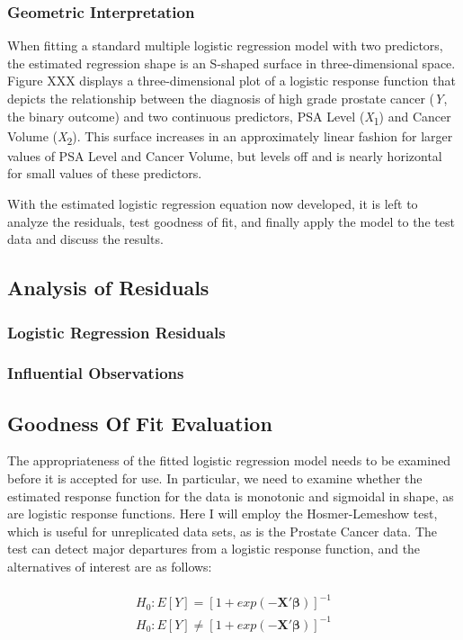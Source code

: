 \subsubsection{Geometric Interpretation}
When fitting a standard multiple logistic regression model with two predictors, the estimated regression shape is an S-shaped surface in three-dimensional space. Figure XXX displays a three-dimensional plot of a logistic response function that depicts the relationship between the diagnosis of high grade prostate cancer (\textit{Y}, the binary outcome) and two continuous predictors, PSA Level (\textit{X}\textsubscript{1}) and Cancer Volume (\textit{X}\textsubscript{2}). This surface increases in an approximately linear fashion for larger values of PSA Level and Cancer Volume, but levels off and is nearly horizontal for small values of these predictors.

With the estimated logistic regression equation now developed, it is left to analyze the residuals, test goodness of fit, and finally apply the model to the test data and discuss the results.

\subsection{Analysis of Residuals}

\subsubsection{Logistic Regression Residuals}
\subsubsection{Influential Observations}

\subsection{Goodness Of Fit Evaluation}
The appropriateness of the fitted logistic regression model needs to be examined before it is accepted for use. In particular, we need to examine whether the estimated response function for the data is monotonic and sigmoidal in shape, as are logistic response functions. Here I will employ the Hosmer-Lemeshow test, which is useful for unreplicated data sets, as is the Prostate Cancer data. The test can detect major departures from a logistic response function, and the alternatives of interest are as follows:

\begin{align}
\begin{split}
	H_0: E[Y]=  [1+exp(-\textbf{X}'\boldsymbol{\beta})]^{-1} \\
	H_0: E[Y] \neq  [1+exp(-\textbf{X}'\boldsymbol{\beta})]^{-1}
\end{split}
\end{align}

